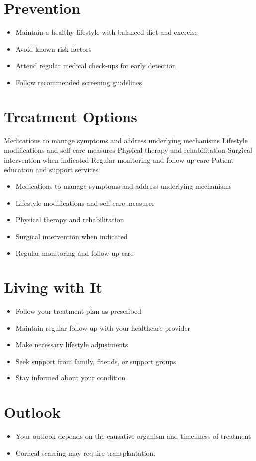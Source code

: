 \section{Prevention}
\begin{itemize}[noitemsep]
  \item Maintain a healthy lifestyle with balanced diet and exercise
  \item Avoid known risk factors
  \item Attend regular medical check-ups for early detection
  \item Follow recommended screening guidelines
\end{itemize}
\section{Treatment Options}
Medications to manage symptoms and address underlying mechanisms Lifestyle modifications and self-care measures Physical therapy and rehabilitation Surgical intervention when indicated Regular monitoring and follow-up care Patient education and support services

\begin{itemize}[noitemsep]
  \item Medications to manage symptoms and address underlying mechanisms
  \item Lifestyle modifications and self-care measures
  \item Physical therapy and rehabilitation
  \item Surgical intervention when indicated
  \item Regular monitoring and follow-up care
\end{itemize}
\section{Living with It}
\begin{itemize}[noitemsep]
  \item Follow your treatment plan as prescribed
  \item Maintain regular follow-up with your healthcare provider
  \item Make necessary lifestyle adjustments
  \item Seek support from family, friends, or support groups
  \item Stay informed about your condition
\end{itemize}
\section{Outlook}
\begin{itemize}[noitemsep]
  \item Your outlook depends on the causative organism and timeliness of treatment
  \item Corneal scarring may require transplantation.
\end{itemize}
